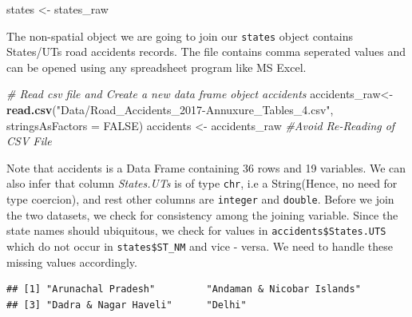 \documentclass[]{article}
\newenvironment{Shaded}{}{}
\newcommand{\CommentTok}[1]{\textcolor[rgb]{0.38,0.63,0.69}{\textit{#1}}}
\newcommand{\DataTypeTok}[1]{\textcolor[rgb]{0.56,0.13,0.00}{#1}}
\newcommand{\KeywordTok}[1]{\textcolor[rgb]{0.00,0.44,0.13}{\textbf{#1}}}
\newcommand{\NormalTok}[1]{#1}
\newcommand{\OperatorTok}[1]{\textcolor[rgb]{0.40,0.40,0.40}{#1}}
\newcommand{\OtherTok}[1]{\textcolor[rgb]{0.00,0.44,0.13}{#1}}
\newcommand{\StringTok}[1]{\textcolor[rgb]{0.25,0.44,0.63}{#1}}
\begin{document}
\begin{Shaded}
\begin{Highlighting}[]
\NormalTok{states <-}\StringTok{ }\NormalTok{states_raw}
\end{Highlighting}
\end{Shaded}

The non-spatial object we are going to join our \texttt{states} object
contains States/UTs road accidents records. The file contains comma
seperated values and can be opened using any spreadsheet program like MS
Excel.

\begin{Shaded}
\begin{Highlighting}[]
\CommentTok{# Read csv file and Create a new data frame object accidents}
\NormalTok{accidents_raw<-}\StringTok{ }\KeywordTok{read.csv}\NormalTok{(}\StringTok{"Data/Road_Accidents_2017-Annuxure_Tables_4.csv"}\NormalTok{, }\DataTypeTok{stringsAsFactors =} \OtherTok{FALSE}\NormalTok{)}
\NormalTok{accidents <-}\StringTok{ }\NormalTok{accidents_raw }\CommentTok{#Avoid Re-Reading of CSV File}
\end{Highlighting}
\end{Shaded}

Note that accidents is a Data Frame containing 36 rows and 19 variables.
We can also infer that column \emph{States.UTs} is of type \texttt{chr},
i.e a String(Hence, no need for type coercion), and rest other columns
are \texttt{integer} and \texttt{double}. Before we join the two
datasets, we check for consistency among the joining variable. Since the
state names should ubiquitous, we check for values in
\texttt{accidents\$States.UTS} which do not occur in
\texttt{states\$ST\_NM} and vice - versa. We need to handle these
missing values accordingly.

\begin{Shaded}
\end{Shaded}

\begin{verbatim}
## [1] "Arunachal Pradesh"         "Andaman & Nicobar Islands"
## [3] "Dadra & Nagar Haveli"      "Delhi"
\end{verbatim}

\begin{Shaded}
\end{Shaded}
\end{document}
